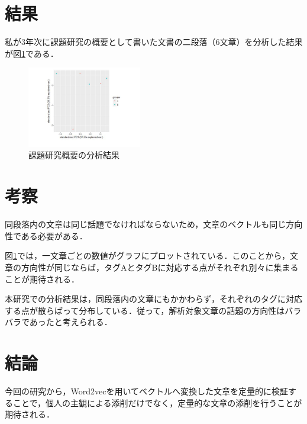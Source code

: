 \documentclass[uplatex,twocolumn,dvipdfmx]{jsarticle}
\begin{document}
\section{結果}
私が3年次に課題研究の概要として書いた文書の二段落（6文章）を分析した結果が図\ref{分析結果}である．
\begin{figure}[h]
\centering
\includegraphics[width=5cm]{02.pdf}
\caption{課題研究概要の分析結果}\label{分析結果}
\end{figure}

\section{考察}

同段落内の文章は同じ話題でなければならないため，文章のベクトルも同じ方向性である必要がある．

図\ref{分析結果}では，一文章ごとの数値がグラフにプロットされている．このことから，文章の方向性が同じならば，タグAとタグBに対応する点がそれぞれ別々に集まることが期待される．

本研究での分析結果は，同段落内の文章にもかかわらず，それぞれのタグに対応する点が散らばって分布している．従って，解析対象文章の話題の方向性はバラバラであったと考えられる．

\section{結論}

今回の研究から，Word2vecを用いてベクトルへ変換した文章を定量的に検証することで，個人の主観による添削だけでなく，定量的な文章の添削を行うことが期待される．


\end{document}
